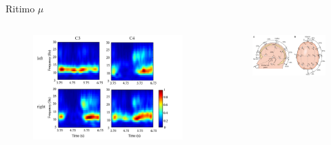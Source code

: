 \documentclass{beamer}
\begin{document}
\begin{frame}{Ritimo $\mu$}
    \begin{columns}
        \begin{column}{0.5\textwidth}
           \begin{center}
               \begin{figure}
                   \centering
                   \includegraphics[scale=0.25]{Images/mu-left-vs-right.png}
                   \caption{\cite{Qin2004}}
                   \label{fig:Estagio_BCI}
               \end{figure}
           \end{center}
         \end{column}
         \begin{column}{0.5\textwidth}
            \begin{figure}
                \centering
               \includegraphics[scale=0.45]{Images/10-20_cranio.png}
               \caption{\cite{EEGPrinciple}}
               \label{fig:Estagio_BCI}
            \end{figure}
         \end{column}
    \end{columns}           
\end{frame}
\end{document}
